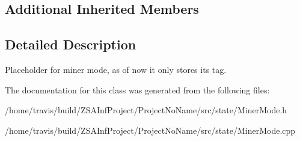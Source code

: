 \subsection*{Additional Inherited Members}


\subsection{Detailed Description}
Placeholder for miner mode, as of now it only stores its tag. 

The documentation for this class was generated from the following files\-:\begin{DoxyCompactItemize}
\item 
/home/travis/build/\-Z\-S\-A\-Inf\-Project/\-Project\-No\-Name/src/state/Miner\-Mode.\-h\item 
/home/travis/build/\-Z\-S\-A\-Inf\-Project/\-Project\-No\-Name/src/state/Miner\-Mode.\-cpp\end{DoxyCompactItemize}
